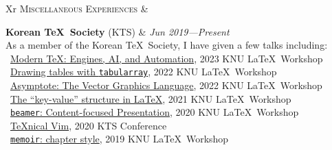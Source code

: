 \documentclass[a4paper,10pt]{memoir}
\begin{document}
\begin{tblr}{Xr}
  {\Large\textsc{Miscellaneous Experiences}}                                                                                                                                                             &                                               \\ \hline

  \textbf{Korean \TeX\ Society} (KTS)                                                                                                                                                        & \textit{Jun 2019---Present}                   \\
   As a member of the Korean \TeX\ Society, I have given a few talks including:                                                                                             \\
   \textbullet\ \href{https://github.com/Zeta611/modern-tex-engines-automation-ai-latex-workshop-2023}{Modern \TeX: Engines, AI, and Automation}, 2023 KNU \LaTeX\ Workshop \\
   \textbullet\ \href{https://github.com/Zeta611/tabularray-tutorial-latex-workshop-2022}{Drawing tables with \texttt{tabularray}}, 2022 KNU \LaTeX\ Workshop               \\
   \textbullet\ \href{https://github.com/Zeta611/asymptote-tutorial-latex-workshop-2021}{Asymptote: The Vector Graphics Language}, 2022 KNU \LaTeX\ Workshop                \\
   \textbullet\ \href{https://github.com/Zeta611/key-value-tutorial-latex-workshop-2021}{The ``key-value'' structure in \LaTeX}, 2021 KNU \LaTeX\ Workshop                  \\
   \textbullet\ \href{https://github.com/Zeta611/beamer-tutorial-latex-workshop-2020}{\texttt{beamer}: Content-focused Presentation}, 2020 KNU \LaTeX\ Workshop             \\
   \textbullet\ \href{https://github.com/Zeta611/texnical-vim-kts-conf-2020}{\TeX{}nical Vim}, 2020 KTS Conference                                                          \\
   \textbullet\ \href{https://github.com/Zeta611/chapterstyle-latex-workshop-2019}{\texttt{memoir}: chapter style}, 2019 KNU \LaTeX\ Workshop                               \\ [0.5\onelineskip]


\end{tblr}
\end{document}
